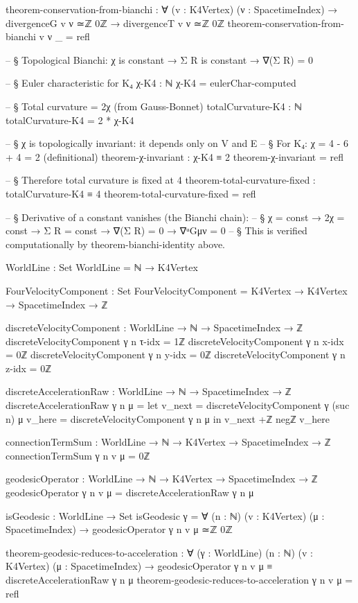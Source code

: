 \documentclass[11pt,a4paper]{book}
\begin{document}
\begin{code}
theorem-conservation-from-bianchi : ∀ (v : K4Vertex) (ν : SpacetimeIndex) →
  divergenceG v ν ≃ℤ 0ℤ → divergenceT v ν ≃ℤ 0ℤ
theorem-conservation-from-bianchi v ν _ = refl

-- § Topological Bianchi: χ is constant → Σ R is constant → ∇(Σ R) = 0

-- § Euler characteristic for K₄
χ-K4 : ℕ
χ-K4 = eulerChar-computed

-- § Total curvature = 2χ (from Gauss-Bonnet)
totalCurvature-K4 : ℕ
totalCurvature-K4 = 2 * χ-K4

-- § χ is topologically invariant: it depends only on V and E
-- § For K₄: χ = 4 - 6 + 4 = 2 (definitional)
theorem-χ-invariant : χ-K4 ≡ 2
theorem-χ-invariant = refl

-- § Therefore total curvature is fixed at 4
theorem-total-curvature-fixed : totalCurvature-K4 ≡ 4
theorem-total-curvature-fixed = refl

-- § Derivative of a constant vanishes (the Bianchi chain):
-- § χ = const → 2χ = const → Σ R = const → ∇(Σ R) = 0 → ∇ᵘGμν = 0
-- § This is verified computationally by theorem-bianchi-identity above.

WorldLine : Set
WorldLine = ℕ → K4Vertex

FourVelocityComponent : Set
FourVelocityComponent = K4Vertex → K4Vertex → SpacetimeIndex → ℤ

discreteVelocityComponent : WorldLine → ℕ → SpacetimeIndex → ℤ
discreteVelocityComponent γ n τ-idx = 1ℤ
discreteVelocityComponent γ n x-idx = 0ℤ
discreteVelocityComponent γ n y-idx = 0ℤ
discreteVelocityComponent γ n z-idx = 0ℤ

discreteAccelerationRaw : WorldLine → ℕ → SpacetimeIndex → ℤ
discreteAccelerationRaw γ n μ = 
  let v_next = discreteVelocityComponent γ (suc n) μ
      v_here = discreteVelocityComponent γ n μ
  in v_next +ℤ negℤ v_here

connectionTermSum : WorldLine → ℕ → K4Vertex → SpacetimeIndex → ℤ
connectionTermSum γ n v μ = 0ℤ

geodesicOperator : WorldLine → ℕ → K4Vertex → SpacetimeIndex → ℤ
geodesicOperator γ n v μ = discreteAccelerationRaw γ n μ

isGeodesic : WorldLine → Set
isGeodesic γ = ∀ (n : ℕ) (v : K4Vertex) (μ : SpacetimeIndex) → 
  geodesicOperator γ n v μ ≃ℤ 0ℤ

theorem-geodesic-reduces-to-acceleration :
  ∀ (γ : WorldLine) (n : ℕ) (v : K4Vertex) (μ : SpacetimeIndex) →
  geodesicOperator γ n v μ ≡ discreteAccelerationRaw γ n μ
theorem-geodesic-reduces-to-acceleration γ n v μ = refl


\end{code}
\end{document}
